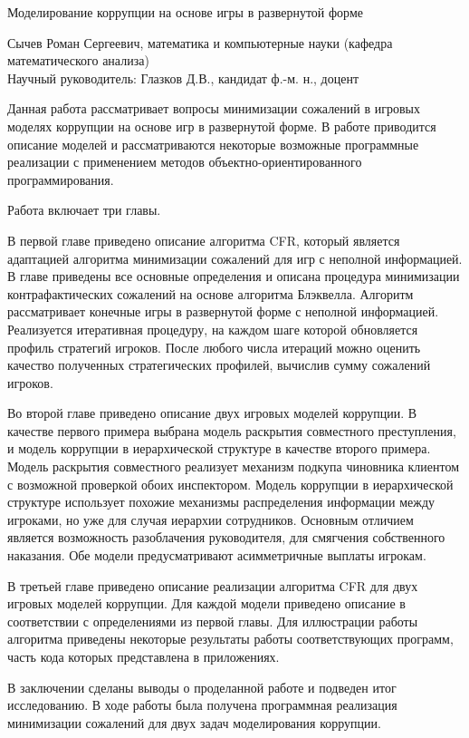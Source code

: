 {\Large Моделирование коррупции на основе игры в развернутой форме
\par}
{\large 
	Сычев Роман Сергеевич, математика  и компьютерные науки (кафедра математического анализа)\\
	Научный руководитель: Глазков Д.В., кандидат ф.-м. н., доцент
\par}
Данная работа рассматривает вопросы минимизации сожалений в игровых моделях коррупции на основе игр в развернутой форме. В работе приводится описание моделей и рассматриваются некоторые возможные программные реализации с применением методов объектно-ориентированного программирования.
\par
Работа включает три главы. 
\par
В первой главе приведено описание алгоритма CFR, который является адаптацией алгоритма минимизации сожалений для игр с неполной информацией. В главе приведены все основные определения и описана процедура минимизации контрафактических сожалений на основе алгоритма Блэквелла. Алгоритм рассматривает конечные игры в развернутой форме с неполной информацией. Реализуется итеративная процедуру, на каждом шаге которой обновляется профиль стратегий игроков. После любого числа итераций можно оценить качество полученных стратегических профилей, вычислив сумму сожалений игроков.
\par
Во второй главе приведено описание двух игровых моделей коррупции. В качестве первого примера выбрана модель раскрытия совместного преступления, и модель коррупции в иерархической структуре в качестве второго примера. Модель раскрытия совместного реализует механизм подкупа чиновника клиентом с возможной проверкой обоих инспектором. Модель коррупции в иерархической структуре использует похожие механизмы распределения информации между игроками, но уже для случая иерархии сотрудников. Основным отличием является возможность разоблачения руководителя, для смягчения собственного наказания. Обе модели предусматривают асимметричные выплаты игрокам.
\par
В третьей главе приведено описание реализации алгоритма CFR для двух игровых моделей коррупции. Для каждой модели приведено описание в соответствии с определениями из первой главы. Для иллюстрации работы алгоритма приведены некоторые результаты работы соответствующих программ, часть кода которых представлена в приложениях.
\par
В заключении сделаны выводы о проделанной работе и подведен итог исследованию. В ходе работы была получена программная реализация минимизации сожалений для двух задач моделирования коррупции.